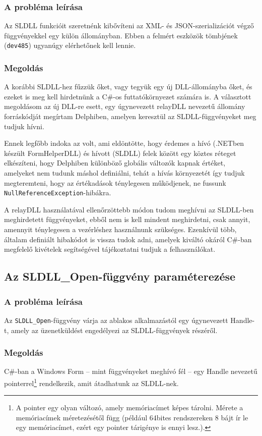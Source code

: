 \documentclass[tocnopagenum]{thesis-ekf}
\begin{document}
	\subsubsection{A probléma leírása} Az SLDLL funkcióit szeretnénk kibővíteni az XML- és JSON-szerializációt végző függvényekkel egy külön állományban. Ebben a felmért eszközök tömbjének (\verb*|dev485|) ugyanúgy elérhetőnek kell lennie.
	\subsubsection{Megoldás} A korábbi SLDLL-hez fűzzük őket, vagy tegyük egy új DLL-állományba őket, és ezeket is meg kell hirdetnünk a C\#-os futtatókörnyezet számára is. A választott megoldásom az új DLL-re esett, egy úgynevezett relayDLL nevezetű állomány forráskódját megírtam Delphiben, amelyen keresztül az SLDLL-függvényeket meg tudjuk hívni.
	
	Ennek legfőbb indoka az volt, ami eldöntötte, hogy érdemes a hívó (.NETben készült FormHelperDLL) és hívott (SLDLL) felek között egy köztes réteget elkészíteni, hogy Delphiben különböző globális változók kapnak értéket, amelyeket nem tudunk máshol definiálni, tehát a hívás környezetét így tudjuk megteremteni, hogy az értékadások ténylegesen működjenek, ne fussunk \verb*|NullReferenceException|-hibákra.
	
	A relayDLL használatával ellenőrzöttebb módon tudom meghívni az SLDLL-ben meghirdetett függvényeket, ebből nem is kell mindent meghirdetni, csak annyit, amennyit ténylegesen a vezérléshez használnunk szükséges. Ezenkívül több, általam definiált hibakódot is vissza tudok adni, amelyek kiváltó okáról C\#-ban megfelelő kivételek segítségével tájékoztatni tudjuk a felhasználókat.
	\subsection{Az SLDLL\_Open-függvény paraméterezése}
	\subsubsection{A probléma leírása} Az \verb*|SLDLL_Open|-függvény várja az ablakos alkalmazástól egy úgynevezett Handle-t, amely az üzenetküldést engedélyezi az SLDLL-függvények részéről.
	\subsubsection{Megoldás} C\#-ban a Windows Form -- mint függvényeket meghívó fél -- egy Handle nevezetű pointerrel\footnote{A pointer egy olyan változó, amely memóriacímet képes tárolni. Mérete a memóriacímek méretezésétől függ (például 64bites rendszereken 8 bájt ír le egy memóriacímet, ezért egy pointer tárigénye is ennyi lesz.).} rendelkezik, amit átadhatunk az SLDLL-nek.
\end{document}
